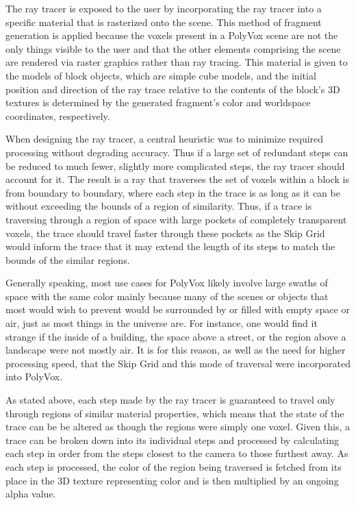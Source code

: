 \documentclass[onecolumn, draftclsnofoot,10pt, compsoc]{IEEEtran}
\newcounter{threesection}[subsubsection]
\newcounter{foursection}[threesection]
\begin{document}
The ray tracer is exposed to the user by incorporating the ray tracer into a specific material that is rasterized onto the scene.
This method of fragment generation is applied because the voxels present in a PolyVox scene are not the only things visible to the user and that the other elements comprising the scene are rendered via raster graphics rather than ray tracing.
This material is given to the models of block objects, which are simple cube models, and the initial position and direction of the ray trace relative to the contents of the block’s 3D textures is determined by the generated fragment’s color and worldspace coordinates, respectively.

When designing the ray tracer, a central heuristic was to minimize required processing without degrading accuracy.
Thus if a large set of redundant steps can be reduced to much fewer, slightly more complicated steps, the ray tracer should account for it.
The result is a ray that traverses the set of voxels within a block is from boundary to boundary, where each step in the trace is as long as it can be without exceeding the bounds of a region of similarity.
Thus, if a trace is traversing through a region of space with large pockets of completely transparent voxels,  the trace should travel faster through these pockets as the Skip Grid would inform the trace that it may extend the length of its steps to match the bounds of the similar regions.

Generally speaking, most use cases for PolyVox likely involve large swaths of space with the same color mainly because many of the scenes or objects that most would wish to prevent would be surrounded by or filled with empty space or air, just as most things in the universe are. For instance, one would find it strange if the inside of a building, the space above a street, or the region above a landscape were not mostly air. It is for this reason, as well as the need for higher processing speed, that the Skip Grid and this mode of traversal were incorporated into PolyVox.


As stated above, each step made by the ray tracer is guaranteed to travel only through regions of similar material properties, which means that the state of the trace can be be altered as though the regions were simply one voxel.
Given this, a trace can be broken down into its individual steps and processed by calculating each step in order from the steps closest to the camera to those furthest away.
As each step is processed, the color of the region being traversed is fetched from its place in the 3D texture representing color and is then multiplied by an ongoing alpha value.
\end{document}
